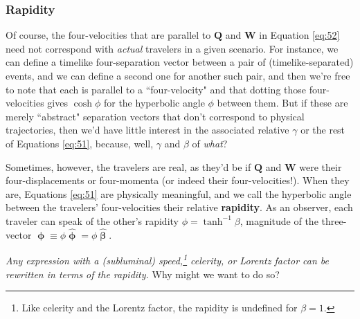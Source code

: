 \documentclass[12pt]{article}
\renewcommand{\vv}[1]{\mathbf{#1}}
\newcommand{\hatbeta}{\bm{\hat{\upbeta}}}
\newcommand{\vvphi}{\bm{\upphi}}
\newcommand{\hatphi}{\bm{\hat{\upphi}}}
\begin{document}
\subsubsection{Rapidity}\label{sssec:rapidity}

Of course, the four-velocities that are parallel to $\vv Q$ and $\vv W$ in Equation \ref{eq:52} need not correspond with \emph{actual} travelers in a given scenario. For instance, we can define a timelike four-separation vector between a pair of (timelike-separated) events, and we can define a second one for another such pair, and then we're free to note that each is parallel to a ``four-velocity" and that dotting those four-velocities gives $\cosh{\phi}$ for the hyperbolic angle $\phi$ between them. But if these are merely ``abstract" separation vectors that don't correspond to physical trajectories, then we'd have little interest in the associated relative $\gamma$ or the rest of Equations \ref{eq:51}, because, well, $\gamma$ and $\beta$ of \emph{what}?

Sometimes, however, the travelers are real, as they'd be if $\vv Q$ and $\vv W$ were their four-displacements or four-momenta (or indeed their four-velocities!). When they are, Equations \ref{eq:51} are physically meaningful, and we call the hyperbolic angle between the travelers' four-velocities their relative \textbf{rapidity}. As an observer, each traveler can speak of the other's rapidity $\phi = \tanh^{-1}{\beta}$, magnitude of the three-vector $\vvphi \equiv \phi \hatphi = \phi \hatbeta$.

\emph{Any expression with a (subluminal) speed,\footnote{Like celerity and the Lorentz factor, the rapidity is undefined for $\beta = 1$.} celerity, or Lorentz factor can be rewritten in terms of the rapidity.} Why might we want to do so?
\end{document}
